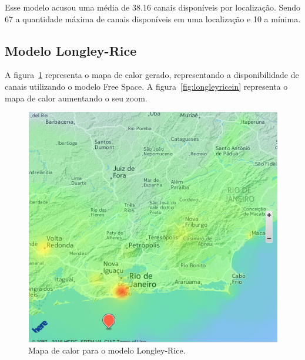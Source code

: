 \FloatBarrier

Esse modelo acusou uma média de 38.16 canais disponíveis por localização. Sendo 67 a quantidade máxima de canais disponíveis em uma localização e 10 a mínima.

\subsection{Modelo Longley-Rice}

A figura~\ref{fig:longleyriceout} representa o mapa de calor gerado, representando a disponibilidade de canais utilizando o modelo Free Space. A figura~\ref{fig:longleyricein} representa o mapa de calor aumentando o seu zoom.

\begin{figure}[htb]
\centering
\includegraphics[width=1.0\textwidth]{figs/longleyriceout}
\caption[Mapa de calor para o modelo Longley-Rice.]
{Mapa de calor para o modelo Longley-Rice.}
\label{fig:longleyriceout}
\end{figure} 

